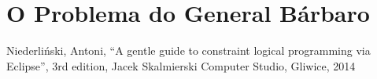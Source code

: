 \documentclass{article}
\begin{document}
\section{O Problema do General Bárbaro}






  \begin{thebibliography}{2}

    Niederliński, Antoni,
    ``A gentle guide to constraint logical programming via Eclipse'',
    3rd edition, Jacek Skalmierski Computer Studio, Gliwice, 2014



  \end{thebibliography}
\end{document}
